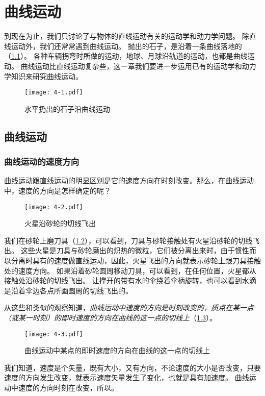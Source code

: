 \chapter{曲线运动}\label{chp:curve_movement}
到现在为止，我们只讨论了与物体的直线运动有关的运动学和动力学问题。
除直线运动外，我们还常常遇到曲线运动。
抛出的石子，是沿着一条曲线落地的（\cref{fig:4-1}）。
各种车辆拐弯时所做的运动，地球、月球沿轨道的运动，也都是曲线运动。
曲线运动比直线运动复杂些，这一章我们要进一步运用已有的运动学和动力学知识来研究曲线运动。

\begin{figure}
  \texttt{[image: 4-1.pdf]}
  \caption{水平扔出的石子沿曲线运动}\label{fig:4-1}
\end{figure}

\section{曲线运动}
\subsection{曲线运动的速度方向}
曲线运动跟直线运动的明显区别是它的速度方向在时刻改变。那么，在曲线运动中，速度的方向是怎样确定的呢？

\begin{figure}
  \texttt{[image: 4-2.pdf]}
  \caption{火星沿砂轮的切线飞出}\label{fig:4-2}
\end{figure}

我们在砂轮上磨刀具（\cref{fig:4-2}），可以看到，刀具与砂轮接触处有火星沿砂轮的切线飞出。
这些火星是刀具与砂轮磨出的炽热的微粒，它们被分离出来时，由于惯性而以分离时具有的速度做直线运动，因此，火星飞出的方向就表示砂轮上跟刀具接触处的速度方向。
如果沿着砂轮圆周移动刀具，可以看到，在任何位置，火星都从接触处沿砂轮的切线飞出。
让撑开的带有水的伞绕着伞柄旋转，也可以看到水滴是沿着伞边各点所画圆周的切线飞出的。

从这些和类似的观察知道，\emph{曲线运动中速度的方向是时刻改变的，质点在某一点（或某一时刻）的即时速度的方向在曲线的这一点的切线上}（\cref{fig:4-3}）。

\begin{figure}
  \texttt{[image: 4-3.pdf]}
  \caption{曲线运动中某点的即时速度的方向在曲线的这一点的切线上}\label{fig:4-3}
\end{figure}

我们知道，速度是个矢量，既有大小，又有方向，不论速度的大小是否改变，只要速度的方向发生改变，就表示速度矢量发生了变化，也就是具有加速度。
曲线运动中速度的方向时刻在改变，所以。

